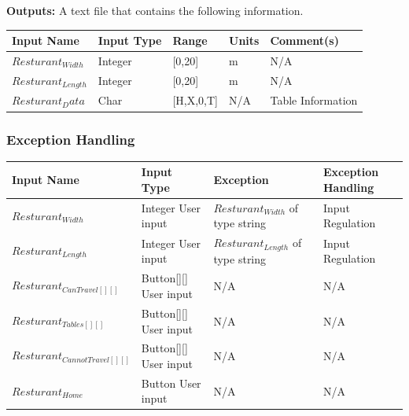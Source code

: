 \documentclass [10pt]{article}
\begin{document}
\pagebreak

\textbf{Outputs: }A text file that contains the following information. \\

\begin{longtable}{|l|l|l|l|l|}\hline 
	\rowcolor{tableCell}\textbf{Input Name} & \textbf{Input Type} & \textbf{Range} & \textbf{Units} & \textbf{Comment(s)} \\ \hline
	$ Resturant_{Width} $ & Integer &  [0,20] & m &  N/A\\ \hline
	\rowcolor{tableCell}$ Resturant_{Length} $ & Integer  &  [0,20] & m &  N/A\\ \hline
	$ Resturant_Data $& Char  &  [H,X,0,T] & N/A & Table Information \\ \hline
\end{longtable}

\subsubsection{Exception Handling}

\begin{longtable}{|l|l|l|l|}\hline 
	\rowcolor{tableCell}\textbf{Input Name} & \textbf{Input Type} & \textbf{Exception} & \textbf{Exception Handling} \\ \hline
	$ Resturant_{Width} $ & Integer User input & $ Resturant_{Width} $ of type string &  Input Regulation \\ \hline
	\rowcolor{tableCell}$ Resturant_{Length} $ & Integer User input & $ Resturant_{Length} $ of type string &  Input Regulation \\ \hline
	$ Resturant_{CanTravel[][]} $ & Button[][] User input &  N/A & N/A  \\ \hline
	\rowcolor{tableCell}$ Resturant_{Tables[][]} $ & Button[][] User input &  N/A & N/A \\ \hline
	$ Resturant_{CannotTravel[][]} $ & Button[][] User input &  N/A & N/A  \\ \hline
	\rowcolor{tableCell}$ Resturant_{Home} $ & Button User input &  N/A & N/A  \\ \hline
\end{longtable}


\end{document}
